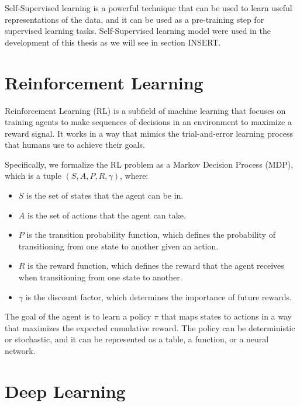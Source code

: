 Self-Supervised learning is a powerful technique that can be used to learn useful representations of the data, and it can be used as a pre-training step for supervised learning tasks.
Self-Supervised learning model were used in the development of this thesis as we will see in section INSERT.


\section{Reinforcement Learning}
\label{sec:rl}
Reinforcement Learning (RL) is a subfield of machine learning that focuses on training agents to make sequences of decisions in an environment to maximize a reward signal.
It works in a way that mimics the trial-and-error learning process that humans use to achieve their goals.

Specifically, we formalize the RL problem as a Markov Decision Process (MDP), which is a tuple $(S, A, P, R, \gamma)$, where:
\begin{itemize}
    \item $S$ is the set of states that the agent can be in.
    \item $A$ is the set of actions that the agent can take.
    \item $P$ is the transition probability function, which defines the probability of transitioning from one state to another given an action.
    \item $R$ is the reward function, which defines the reward that the agent receives when transitioning from one state to another.
    \item $\gamma$ is the discount factor, which determines the importance of future rewards.
\end{itemize}

The goal of the agent is to learn a policy $\pi$ that maps states to actions in a way that maximizes the expected cumulative reward.
The policy can be deterministic or stochastic, and it can be represented as a table, a function, or a neural network.







\section{Deep Learning}
\label{sec:dl}
